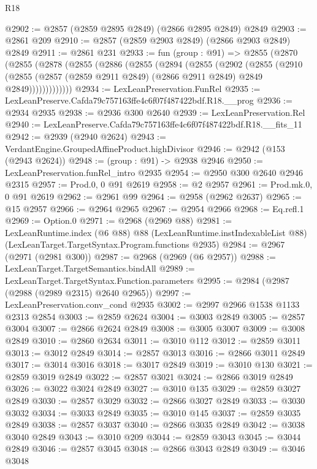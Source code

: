 \begin{lexlean}{R18}
\begin{coremodule}
@2902 := @2857 (@2859 @2895 @2849) (@2866 @2895 @2849) @2849
@2903 := @2861 @209
@2910 := @2857 (@2859 @2903 @2849) (@2866 @2903 @2849) @2849
@2911 := @2861 @231
@2933 := fun (group : @91) =>
  @2855
    (@2870
      (@2855
        (@2878
          (@2855
            (@2886
              (@2855
                (@2894
                  (@2855
                    (@2902
                      (@2855
                        (@2910
                          (@2855
                            (@2857 (@2859 @2911 @2849) (@2866 @2911 @2849) @2849 @2849)))))))))))))
@2934 := LexLeanPreservation.FunRel
@2935 := LexLeanPreserve.Cafda79c757163ffe4c6f07f487422bdf.R18.__prog
@2936 := @2934 @2935
@2938 := @2936 @300 @2640
@2939 := LexLeanPreservation.Rel
@2940 := LexLeanPreserve.Cafda79c757163ffe4c6f07f487422bdf.R18.__fits_11
@2942 := @2939 (@2940 @2624)
@2943 := VerdantEngine.GroupedAffineProduct.highDivisor
@2946 := @2942 (@153 (@2943 @2624))
@2948 := (group : @91) -> @2938 @2946
@2950 := LexLeanPreservation.funRel_intro @2935
@2954 := @2950 @300 @2640 @2946 @2315
@2957 := Prod.{0, 0} @91 @2619
@2958 := @2 @2957
@2961 := Prod.mk.{0, 0} @91 @2619
@2962 := @2961 @99
@2964 := @2958 (@2962 @2637)
@2965 := @15 @2957
@2966 := @2964 @2965
@2967 := @2954 @2966
@2968 := Eq.refl.{1}
@2969 := Option.{0}
@2971 := @2968 (@2969 @88)
@2981 := LexLeanRuntime.index
    (@6 @88)
    @88
    (LexLeanRuntime.instIndexableList @88)
    (LexLeanTarget.TargetSyntax.Program.functions @2935)
@2984 := @2967 (@2971 (@2981 @300))
@2987 := @2968 (@2969 (@6 @2957))
@2988 := LexLeanTarget.TargetSemantics.bindAll
@2989 := LexLeanTarget.TargetSyntax.Function.parameters
@2995 := @2984 (@2987 (@2988 (@2989 @2315) @2640 @2965))
@2997 := LexLeanPreservation.conv_cond @2935
@3002 := @2997 @2966 @1538 @1133 @2313 @2854
@3003 := @2859 @2624
@3004 := @3003 @2849
@3005 := @2857 @3004
@3007 := @2866 @2624 @2849
@3008 := @3005 @3007
@3009 := @3008 @2849
@3010 := @2860 @2634
@3011 := @3010 @112
@3012 := @2859 @3011
@3013 := @3012 @2849
@3014 := @2857 @3013
@3016 := @2866 @3011 @2849
@3017 := @3014 @3016
@3018 := @3017 @2849
@3019 := @3010 @130
@3021 := @2859 @3019 @2849
@3022 := @2857 @3021
@3024 := @2866 @3019 @2849
@3026 := @3022 @3024 @2849
@3027 := @3010 @135
@3029 := @2859 @3027 @2849
@3030 := @2857 @3029
@3032 := @2866 @3027 @2849
@3033 := @3030 @3032
@3034 := @3033 @2849
@3035 := @3010 @145
@3037 := @2859 @3035 @2849
@3038 := @2857 @3037
@3040 := @2866 @3035 @2849
@3042 := @3038 @3040 @2849
@3043 := @3010 @209
@3044 := @2859 @3043
@3045 := @3044 @2849
@3046 := @2857 @3045
@3048 := @2866 @3043 @2849
@3049 := @3046 @3048

\end{coremodule}
\end{lexlean}
